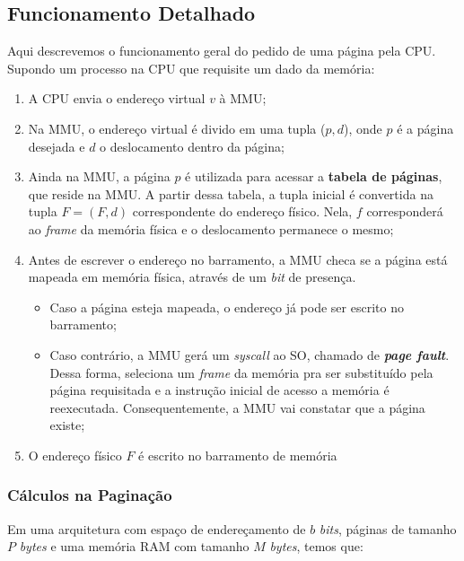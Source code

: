 \subsection{Funcionamento Detalhado}
Aqui descrevemos o funcionamento geral do pedido de uma página pela CPU. Supondo um processo na CPU que requisite um dado da memória:

\begin{enumerate}
  \item A CPU envia o endereço virtual $v$ à MMU;

  \item Na MMU, o endereço virtual é divido em uma tupla ($p,d$), onde $p$ é a página desejada e $d$ o deslocamento dentro da página;

  \item Ainda na MMU, a página $p$ é utilizada para acessar a \textbf{tabela de páginas}, que reside na MMU. A partir dessa tabela, a tupla inicial é convertida na tupla $F = (F,d)$ correspondente do endereço físico. Nela, $f$ corresponderá ao \textit{frame} da memória física e o deslocamento permanece o mesmo;

  \item Antes de escrever o endereço no barramento, a MMU checa se a página está mapeada em memória física, através de um \textit{bit} de presença.

  \begin{itemize}
    \item Caso a página esteja mapeada, o endereço já pode ser escrito no barramento;

    \item Caso contrário, a MMU gerá um \textit{syscall} ao SO, chamado de \textbf{\textit{page fault}}. Dessa forma, seleciona um \textit{frame} da memória pra ser substituído pela página requisitada e a instrução inicial de acesso a memória é reexecutada. Consequentemente, a MMU vai constatar que a página existe;
  \end{itemize}

  \item O endereço físico $F$ é escrito no barramento de memória
\end{enumerate}


\subsubsection{Cálculos na Paginação}
Em uma arquitetura com espaço de endereçamento de $b$ \textit{bits}, páginas de tamanho $P$ \textit{bytes} e uma memória RAM com tamanho $M$ \textit{bytes}, temos que:

